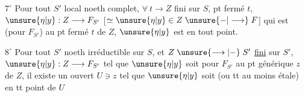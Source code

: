 $7^\circ$ Pour tout $S'$ local noeth complet,  $\forall\ t\longrightarrow Z$  fini sur $S$, pt fermé $t$, 
 $\unsure{\eta|y}:Z\longrightarrow F_{S'}$ [$\simeq\unsure{\eta|y}\in Z\mathrel{\unsure{-|\longrightarrow}}F$]
qui est  (pour $F_{S'}$) au pt fermé $t$ de $Z$, $\unsure{\eta|y}$ est   en tout point.

$8^\circ$ Pour tout $S'$ noeth irréductible sur $S$, et $Z\mathrel{\unsure{\longrightarrow|-}}S'$  \uline{fini} sur $S'$, $\unsure{\eta|y}:Z\longrightarrow F_{S'}$ tel que $\unsure{\eta|y}$ soit  pour $F_{S'}$ au pt générique $z$ de $Z$, il existe un ouvert $U\ni z$ tel que $\unsure{\eta|y}$ soit  (ou tt au moins étale) en tt point de $U$
